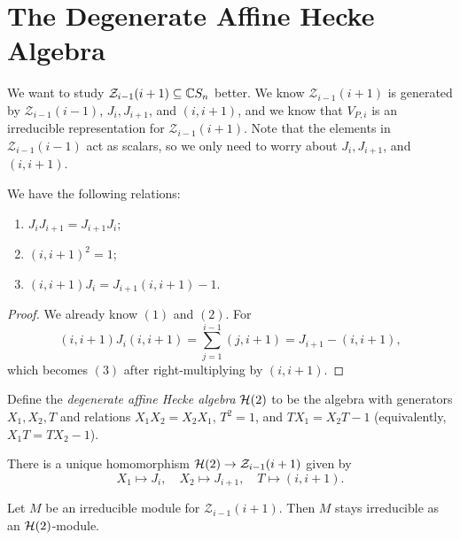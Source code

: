 \section{The Degenerate Affine Hecke Algebra}

\begin{remark}
  We want to study $\mathcal{Z}_{i - 1}(i + 1) \subseteq \mathbb{C} S_n$
  better.
  We know $\mathcal{Z}_{i - 1}(i + 1)$
  is generated by
  $\mathcal{Z}_{i - 1}(i - 1)$, $J_i, J_{i + 1}$, and
  $(i, i + 1)$,
  and we know that 
  $V_{P, i}$ is an irreducible representation
  for $\mathcal{Z}_{i - 1}(i + 1)$. Note
  that the elements in $\mathcal{Z}_{i - 1}(i - 1)$
  act as scalars, so we only need
  to worry about $J_i, J_{i + 1}$,
  and $(i, i + 1)$.
\end{remark}

\begin{lemma}
  We have the following relations:
  \begin{enumerate}
    \item $J_i J_{i + 1} = J_{i + 1} J_i$;
    \item $(i, i + 1)^2 = 1$;
    \item $(i, i + 1) J_i = J_{i + 1} (i, i + 1) - 1$.
  \end{enumerate}
\end{lemma}

\begin{proof}
  We already know $(1)$ and $(2)$. For
  \[
    (i, i + 1) J_i (i, i + 1)
    = \sum_{j = 1}^{i - 1} (j, i + 1)
    = J_{i + 1} - (i, i + 1),
  \]
  which becomes $(3)$ after right-multiplying
  by $(i, i + 1)$.
\end{proof}

\begin{definition}
  Define the \emph{degenerate affine Hecke algebra}
  $\mathcal{H}(2)$ to be the algebra
  with generators $X_1, X_2, T$ and relations
  $X_1 X_2 = X_2 X_1$,
  $T^2 = 1$, and
  $T X_1 = X_2 T - 1$ (equivalently,
  $X_1 T = T X_2 - 1$).
\end{definition}

\begin{remark}
  There is a unique homomorphism
  $\mathcal{H}(2) \to \mathcal{Z}_{i - 1}(i + 1)$
  given by
  \[
    X_1 \mapsto J_i, \quad
    X_2 \mapsto J_{i + 1}, \quad
    T \mapsto (i, i + 1).
  \]
\end{remark}

\begin{corollary}
  Let $M$ be an irreducible module
  for $\mathcal{Z}_{i - 1}(i + 1)$.
  Then $M$ stays irreducible as an
  $\mathcal{H}(2)$-module.
\end{corollary}

